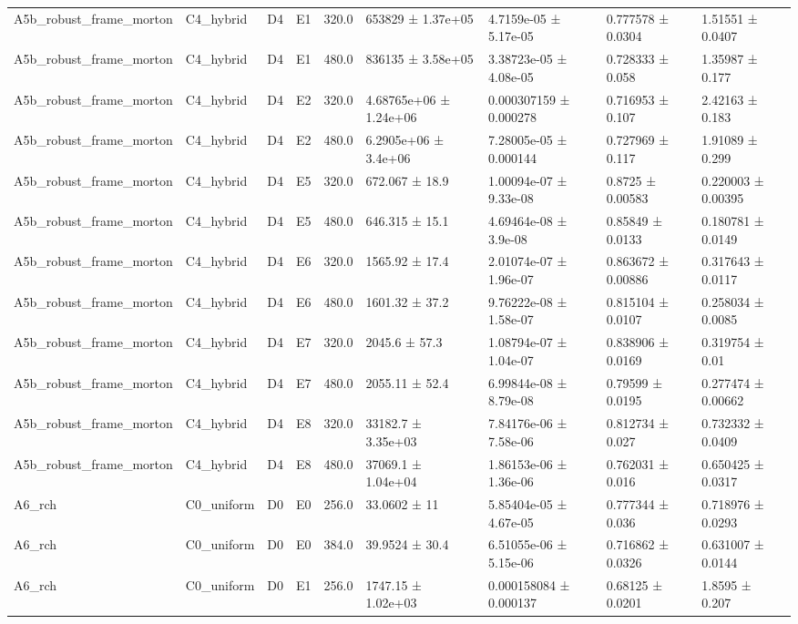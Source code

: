 \begin{table}
\begin{tabular}{lllllllll}
A5b\_robust\_frame\_morton & C4\_hybrid & D4 & E1 & 320.0 & 653829 ± 1.37e+05 & 4.7159e-05 ± 5.17e-05 & 0.777578 ± 0.0304 & 1.51551 ± 0.0407 \\
A5b\_robust\_frame\_morton & C4\_hybrid & D4 & E1 & 480.0 & 836135 ± 3.58e+05 & 3.38723e-05 ± 4.08e-05 & 0.728333 ± 0.058 & 1.35987 ± 0.177 \\
A5b\_robust\_frame\_morton & C4\_hybrid & D4 & E2 & 320.0 & 4.68765e+06 ± 1.24e+06 & 0.000307159 ± 0.000278 & 0.716953 ± 0.107 & 2.42163 ± 0.183 \\
A5b\_robust\_frame\_morton & C4\_hybrid & D4 & E2 & 480.0 & 6.2905e+06 ± 3.4e+06 & 7.28005e-05 ± 0.000144 & 0.727969 ± 0.117 & 1.91089 ± 0.299 \\
A5b\_robust\_frame\_morton & C4\_hybrid & D4 & E5 & 320.0 & 672.067 ± 18.9 & 1.00094e-07 ± 9.33e-08 & 0.8725 ± 0.00583 & 0.220003 ± 0.00395 \\
A5b\_robust\_frame\_morton & C4\_hybrid & D4 & E5 & 480.0 & 646.315 ± 15.1 & 4.69464e-08 ± 3.9e-08 & 0.85849 ± 0.0133 & 0.180781 ± 0.0149 \\
A5b\_robust\_frame\_morton & C4\_hybrid & D4 & E6 & 320.0 & 1565.92 ± 17.4 & 2.01074e-07 ± 1.96e-07 & 0.863672 ± 0.00886 & 0.317643 ± 0.0117 \\
A5b\_robust\_frame\_morton & C4\_hybrid & D4 & E6 & 480.0 & 1601.32 ± 37.2 & 9.76222e-08 ± 1.58e-07 & 0.815104 ± 0.0107 & 0.258034 ± 0.0085 \\
A5b\_robust\_frame\_morton & C4\_hybrid & D4 & E7 & 320.0 & 2045.6 ± 57.3 & 1.08794e-07 ± 1.04e-07 & 0.838906 ± 0.0169 & 0.319754 ± 0.01 \\
A5b\_robust\_frame\_morton & C4\_hybrid & D4 & E7 & 480.0 & 2055.11 ± 52.4 & 6.99844e-08 ± 8.79e-08 & 0.79599 ± 0.0195 & 0.277474 ± 0.00662 \\
A5b\_robust\_frame\_morton & C4\_hybrid & D4 & E8 & 320.0 & 33182.7 ± 3.35e+03 & 7.84176e-06 ± 7.58e-06 & 0.812734 ± 0.027 & 0.732332 ± 0.0409 \\
A5b\_robust\_frame\_morton & C4\_hybrid & D4 & E8 & 480.0 & 37069.1 ± 1.04e+04 & 1.86153e-06 ± 1.36e-06 & 0.762031 ± 0.016 & 0.650425 ± 0.0317 \\
A6\_rch & C0\_uniform & D0 & E0 & 256.0 & 33.0602 ± 11 & 5.85404e-05 ± 4.67e-05 & 0.777344 ± 0.036 & 0.718976 ± 0.0293 \\
A6\_rch & C0\_uniform & D0 & E0 & 384.0 & 39.9524 ± 30.4 & 6.51055e-06 ± 5.15e-06 & 0.716862 ± 0.0326 & 0.631007 ± 0.0144 \\
A6\_rch & C0\_uniform & D0 & E1 & 256.0 & 1747.15 ± 1.02e+03 & 0.000158084 ± 0.000137 & 0.68125 ± 0.0201 & 1.8595 ± 0.207 \\

\end{tabular}
\end{table}
